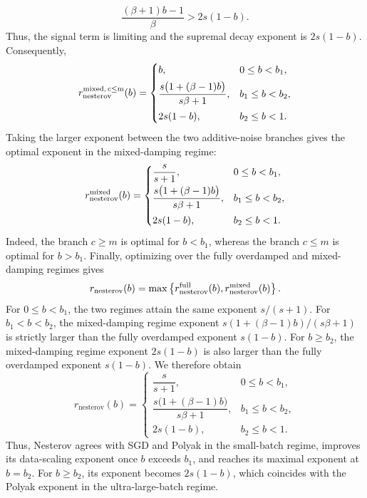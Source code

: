 \documentclass[11pt]{article}
\newcommand{\nesterov}{\mathrm{nesterov}}
\begin{document}
\[
\frac{(\beta+1)b-1}{\beta}>2s(1-b).
\]
Thus, the signal term is limiting and the supremal decay exponent is $2s(1-b)$. Consequently,
\[
r_{\nesterov}^{\rm mixed,\,c\le m}(b)=
\begin{cases}
b,&0\le b<b_1,\\[4pt]
\dfrac{s\bigl(1+(\beta-1)b\bigr)}{s\beta+1},&b_1\le b<b_2,\\[8pt]
2s(1-b),&b_2\le b<1.
\end{cases}
\]
Taking the larger exponent between the two additive-noise branches gives the optimal exponent in the mixed-damping regime:
\[
r_{\nesterov}^{\rm mixed}(b)=
\begin{cases}
\dfrac{s}{s+1},&0\le b<b_1,\\[6pt]
\dfrac{s\bigl(1+(\beta-1)b\bigr)}{s\beta+1},&b_1\le b<b_2,\\[8pt]
2s(1-b),&b_2\le b<1.
\end{cases}
\]
Indeed, the branch $c\ge m$ is optimal for $b<b_1$, whereas the branch $c\le m$ is optimal for $b>b_1$. Finally, optimizing over the fully overdamped and mixed-damping regimes gives
\[
r_{\nesterov}(b)=\max\left\{r_{\nesterov}^{\rm full}(b),r_{\nesterov}^{\rm mixed}(b)\right\}.
\]
For $0\le b<b_1$, the two regimes attain the same exponent $s/(s+1)$. For $b_1<b<b_2$, the mixed-damping regime exponent $s(1+(\beta-1)b)/(s\beta+1)$ is strictly larger than the fully overdamped exponent $s(1-b)$. For $b\ge b_2$, the mixed-damping regime exponent $2s(1-b)$ is also larger than the fully overdamped exponent $s(1-b)$. We therefore obtain
\[
r_{\nesterov}(b)=
\begin{cases}
\dfrac{s}{s+1},&0\le b<b_1,\\[6pt]
\dfrac{s\bigl(1+(\beta-1)b\bigr)}{s\beta+1},&b_1\le b<b_2,\\[8pt]
2s(1-b),&b_2\le b<1.
\end{cases}
\]
Thus, Nesterov agrees with SGD and Polyak in the small-batch regime, improves its data-scaling exponent once $b$ exceeds $b_1$, and reaches its maximal exponent at $b=b_2$. For $b\ge b_2$, its exponent becomes $2s(1-b)$, which coincides with the Polyak exponent in the ultra-large-batch regime.




\end{document}
